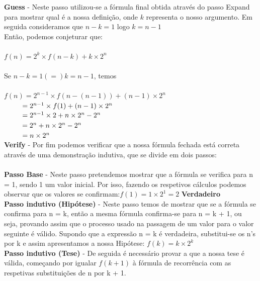 \documentclass[12pt]{article}
\begin{document}
    \noindent \textbf{Guess} -  
    Neste passo utilizou-se a fórmula final obtida através do passo Expand para mostrar qual é a nossa definição, onde \( k \) representa o nosso argumento. Em seguida consideramos que \(n - k = 1 \) logo \( k = n - 1\)\\
    Então, podemos conjeturar que: \\\\
    \(f(n) = 2^k \times f(n - k) + k \times 2^{n}\)\\\\
    Se \(n - k = 1 (=) k = n - 1\), temos \\\\
    \(f(n) = 2^{n-1} \times f(n - (n - 1)) + (n-1) \times 2^{n}\)\\
    \(\hspace*{0.9cm}= 2^{n-1} \times f(1)  + (n-1) \times 2^{n}\)\\
    \(\hspace*{0.9cm}= 2^{n-1} \times 2  + n\times2^{n} - 2^{n}\)\\
    \(\hspace*{0.9cm}= 2^{n}  + n\times2^{n} - 2^{n}\)\\
    \(\hspace*{0.9cm}= n\times2^{n}\)\\
    \newpage
    \noindent \textbf{Verify} - Por fim podemos verificar que a nossa fórmula fechada está correta através de uma demonstração indutiva, que se divide em dois passos:\\\\
    \textbf{Passo Base} - Neste passo pretendemos mostrar que a fórmula se verifica para n = 1, sendo 1 um valor inicial. Por isso, fazendo os respetivos cálculos podemos observar que os valores se confirmam:\newline\newline\hspace*{4cm}\(f(1)= 1\times2^{1}=2\) \textbf{\textcolor{codegreen}{Verdadeiro}}\newline \\
    \textbf{Passo indutivo (Hipótese)} - Neste passo temos de mostrar que se a fórmula se confirma para n = k,
    então a mesma fórmula confirma-se para n = k + 1, ou seja, provando assim que o processo usado na passagem de um valor para o valor seguinte é válido. Supondo que a expressão n = k é verdadeira, substitui-se os n's por k e assim apresentamos a nossa Hipótese: \newline\newline\hspace*{4cm}\(f(k)= k\times2^{k}\)\newline\\
    \textbf{Passo indutivo (Tese)} - De seguida é necessário provar a que a nossa tese é válida, começando por igualar \(f(k+1)\) à fórmula de recorrência com as respetivas substituições de n por k + 1.\\
    \newline
    
\end{document}
